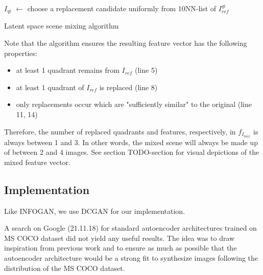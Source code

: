 \documentclass[12pt,a4paper]{article}
\begin{document}
\begin{algorithm}[H]
\DontPrintSemicolon
\LinesNumbered
{}
 {
    $I_{qi}$ $\leftarrow$ choose a replacement candidate uniformly from 10NN-list of $I^{qi}_{ref}$\;
}
 {
} 
\caption{Latent space scene mixing algorithm}\label{alg:img_mixing_algo}
\end{algorithm}

Note that the algorithm ensures the resulting feature vector has the following properties:
\begin{itemize}
   \item at least 1 quadrant remains from $I_{ref}$ (line 5)
   \item at least 1 quadrant of $I_{ref}$ is replaced (line 8)
   \item only replacements occur which are "sufficiently similar" to the original (line 11, 14)
\end{itemize}
Therefore, the number of replaced quadrants and features, respectively, in $f_{I_{mix}}$ is always between 1 and 3. In other words, the mixed scene will always be made up of between 2 and 4 images. See section TODO-section for visual depictions of the mixed feature vector.


\subsection{Implementation}
Like INFOGAN, we use DCGAN for our implementation.

\par A search on Google (21.11.18) for standard autoencoder architectures trained on MS COCO dataset did not yield any useful results. The idea was to draw inspiration from previous work and to ensure as much as possible that the autoencoder architecture would be a strong fit to synthesize images following the distribution of the MS COCO dataset.
\end{document}
